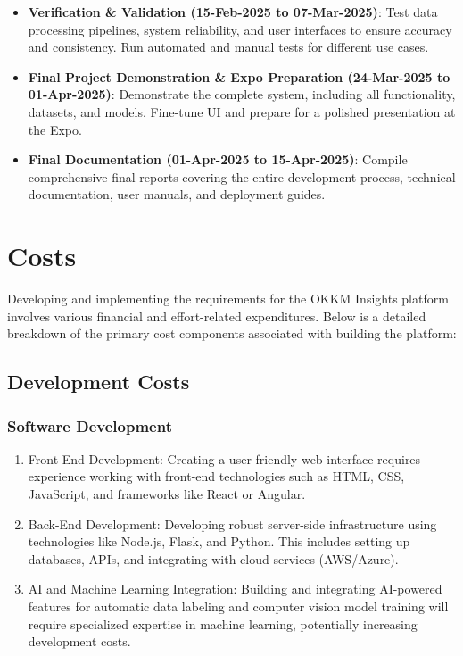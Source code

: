 \documentclass[12pt]{article}
\begin{document}
\begin{itemize}
    \item \textbf{Verification \& Validation (15-Feb-2025 to 07-Mar-2025)}: Test data processing pipelines, system reliability, and user interfaces to ensure accuracy and consistency. Run automated and manual tests for different use cases.
    \item \textbf{Final Project Demonstration \& Expo Preparation (24-Mar-2025 to 01-Apr-2025)}: Demonstrate the complete system, including all functionality, datasets, and models. Fine-tune UI and prepare for a polished presentation at the Expo.
    \item \textbf{Final Documentation (01-Apr-2025 to 15-Apr-2025)}: Compile comprehensive final reports covering the entire development process, technical documentation, user manuals, and deployment guides.
\end{itemize}




\section{Costs}
Developing and implementing the requirements for the OKKM Insights platform involves various financial and effort-related expenditures. 
    Below is a detailed breakdown of the primary cost components associated with building the platform:

\subsection{Development Costs}
\subsubsection{Software Development}
\begin{enumerate}
    \item Front-End Development: Creating a user-friendly web interface requires experience working with front-end technologies such as HTML, CSS, JavaScript, and frameworks like React or Angular.
    \item Back-End Development: Developing robust server-side infrastructure using technologies like Node.js, Flask, and Python. This includes setting up databases, APIs, and integrating with cloud services (AWS/Azure).
    \item AI and Machine Learning Integration: Building and integrating AI-powered features for automatic data labeling and computer vision model training will require specialized expertise in machine learning, potentially increasing development costs.
  \end{enumerate}
\end{document}

